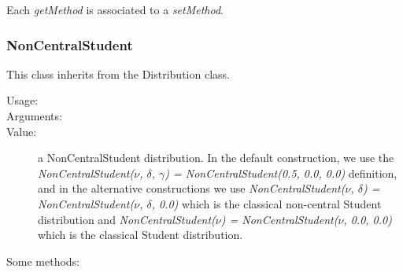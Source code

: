 Each  \textit{getMethod}  is associated to a \textit{setMethod}.

\newpage
\subsubsection{NonCentralStudent}

This class inherits from the Distribution class.

\begin{description}

\item[Usage:] \rule{0pt}{1em}

\item[Arguments:]  \rule{0pt}{1em}

\item[Value:] a NonCentralStudent distribution. In the default construction, we use the \textit{NonCentralStudent($\nu$, $\delta$, $\gamma$) = NonCentralStudent(0.5, 0.0, 0.0)} definition, and in the alternative constructions we use \textit{NonCentralStudent($\nu$, $\delta$) = NonCentralStudent($\nu$, $\delta$, 0.0)} which is the classical non-central Student distribution and \textit{NonCentralStudent($\nu$) = NonCentralStudent($\nu$, 0.0, 0.0)} which is the classical Student distribution.

\item[Some methods:] \rule{0pt}{1em}
\begin{description}


\end{description}
\end{description}
